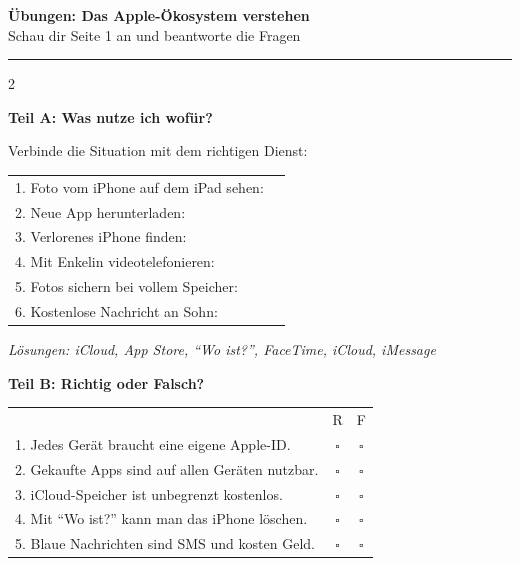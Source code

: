 \documentclass[a4paper,landscape,8pt]{extarticle}
\begin{document}
\newpage


\begin{center}
{\LARGE\bfseries Übungen: Das Apple-Ökosystem verstehen}\\[3pt]
{\normalsize Schau dir Seite 1 an und beantworte die Fragen}
\end{center}

\vspace{3mm}
\hrule
\vspace{4mm}

\begin{multicols}{2}

\textbf{\large Teil A: Was nutze ich wofür?}

Verbinde die Situation mit dem richtigen Dienst:

\vspace{2mm}

\renewcommand{\arraystretch}{1.6}
\begin{tabular}{@{}p{7cm}p{4cm}@{}}
1. Foto vom iPhone auf dem iPad sehen: & \dotfill \\
2. Neue App herunterladen: & \dotfill \\
3. Verlorenes iPhone finden: & \dotfill \\
4. Mit Enkelin videotelefonieren: & \dotfill \\
5. Fotos sichern bei vollem Speicher: & \dotfill \\
6. Kostenlose Nachricht an Sohn: & \dotfill \\
\end{tabular}
\renewcommand{\arraystretch}{1}

{\footnotesize\textit{Lösungen: iCloud, App Store, ``Wo ist?'', FaceTime, iCloud, iMessage}}

\vspace{6mm}

\textbf{\large Teil B: Richtig oder Falsch?}

\vspace{2mm}

\renewcommand{\arraystretch}{1.6}
\begin{tabular}{@{}p{8cm}cc@{}}
& R & F \\
1. Jedes Gerät braucht eine eigene Apple-ID. & $\square$ & $\square$ \\
2. Gekaufte Apps sind auf allen Geräten nutzbar. & $\square$ & $\square$ \\
3. iCloud-Speicher ist unbegrenzt kostenlos. & $\square$ & $\square$ \\
4. Mit ``Wo ist?'' kann man das iPhone löschen. & $\square$ & $\square$ \\
5. Blaue Nachrichten sind SMS und kosten Geld. & $\square$ & $\square$ \\
\end{tabular}
\renewcommand{\arraystretch}{1}


\end{multicols}
\end{document}
